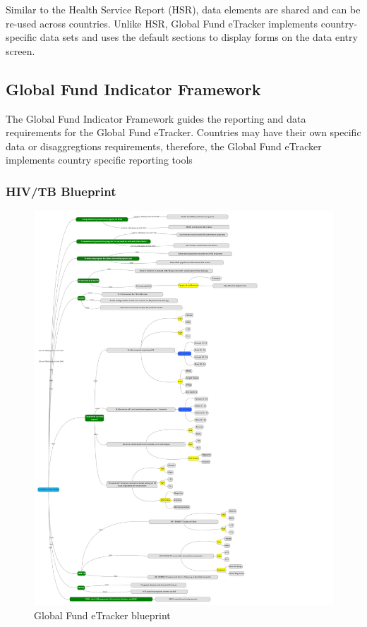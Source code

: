 \documentclass[]{book}
\begin{document}
Similar to the Health Service Report (HSR), data elements are shared and can be re-used across countries. Unlike HSR, Global Fund eTracker implements country-specific data sets and uses the default sections to display forms on the data entry screen.

\hypertarget{global-fund-indicator-framework}{%
\subsection{Global Fund Indicator Framework}\label{global-fund-indicator-framework}}

The Global Fund Indicator Framework guides the reporting and data requirements for the Global Fund eTracker. Countries may have their own specific data or disaggregtions requirements, therefore, the Global Fund eTracker implements country specific reporting tools

\hypertarget{hivtb-blueprint}{%
\subsubsection{HIV/TB Blueprint}\label{hivtb-blueprint}}

\begin{figure}

{\centering \includegraphics[width=0.8\linewidth]{./images/gfmublueprint} 

}

\caption{Global Fund eTracker blueprint}\label{fig:nice-fig2}
\end{figure}
\end{document}
